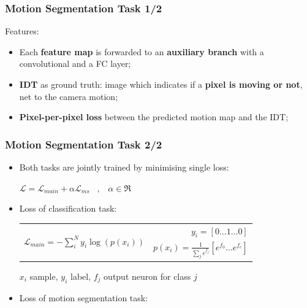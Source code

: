 \documentclass{beamer}
\begin{document}
\begin{frame}
\frametitle{Motion Segmentation Task 1/2}

Features:
\begin{itemize}
\item Each \textbf{feature map} is forwarded to an \textbf{auxiliary branch} with a convolutional and a FC layer;
\item \textbf{IDT} as ground truth: image which indicates if a \textbf{pixel is moving or not}, net to the camera motion;
\item \textbf{Pixel-per-pixel loss} between the predicted motion map and the IDT;
\end{itemize}

\end{frame}

\begin{frame}
\frametitle{Motion Segmentation Task 2/2}
\begin{adjustwidth}{-1.75em}{-1.75em}


\begin{itemize}
	\item Both tasks are jointly trained by minimising single loss:
	\begin{center}
	${\displaystyle {\mathcal{L} = \mathcal{L}_{main} + \alpha \mathcal{L}_{ms} \hspace{10pt} , \hspace{10pt} \alpha \in \Re} }$
	\end{center}
	
	\item Loss of classification task:
	
	\begin{center}
	\begin{tabular}{cr}
		\multirow{2}{*}{$ {\displaystyle \mathcal{L}_{main} = -\sum_i^N{y_i \log (p(x_i))} }$} 
		& $y_i = [0 \dots 1 \dots 0]$ \\
		& $ p(x_i) = \frac{1}{\sum_j e^{f_j}} [ e^{f_0} \dots e^{f_c} ]$
	\end{tabular}
	\end{center}

	{\scriptsize $x_i$ sample, $y_i$ label, $f_j$ output neuron for class $j$ }

	\item Loss of motion segmentation task:
	

\end{itemize}
\end{adjustwidth}
\end{frame}
\end{document}
